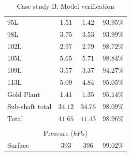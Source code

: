 \begin{appendices}
\begin{table}[h!]
\begin{tabular}{lccr}
		95L  & $ 1.51 $ & $ 1.42 $ & $ 93.95 $\% \\
		98L  & $ 3.75 $ & $ 3.53 $ & $ 93.99 $\% \\
		102L  & $ 2.97 $ & $ 2.79 $ & $ 98.72 $\% \\
		105L  & $ 5.65 $ & $ 5.71 $ & $ 98.84 $\% \\
		109L  & $ 3.57 $ & $ 3.37 $ & $ 94.27 $\% \\
		113L  & $ 5.09 $ & $ 4.84 $ & $ 95.05 $\% \\
		Gold Plant & $ 1.41 $ & $ 1.35 $ & $ 95.14 $\% \\
		Sub-shaft total & $ 34.12 $ & $ 34.76 $ & $ 98.09 $\% \\
		Total & $ 41.65$  & $41.43 $  & $ 98.96 $\% \\
		\\
		\multicolumn{4}{c}{Pressure ($ kPa $)}
		\\
		
		Surface & $ 393 $ & $ 396 $ & $ 99.02 $\% \\
		\hline 
	\end{tabular}
	\caption{Case study B: Model verification}
	\label{Table: B verification}
\end{table}
\end{appendices}

